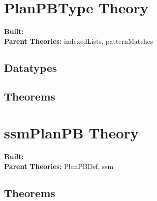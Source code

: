 \documentclass[11pt, twoside]{article}
\begin{document}



\tableofcontents
\cleardoublepage
\HOLpagestyle

\section{PlanPBType Theory}
\begin{flushleft}
\textbf{Built:} \HOLPlanPBTypeDate \\[2pt]
\textbf{Parent Theories:} indexedLists, patternMatches
\end{flushleft}

\subsection{Datatypes}

\HOLPlanPBTypeDatatypes


\subsection{Theorems}

\HOLPlanPBTypeTheorems

\section{ssmPlanPB Theory}
\begin{flushleft}
\textbf{Built:} \HOLssmPlanPBDate \\[2pt]
\textbf{Parent Theories:} PlanPBDef, ssm
\end{flushleft}



\subsection{Theorems}

\HOLssmPlanPBTheorems

\HOLindex
\end{document}
